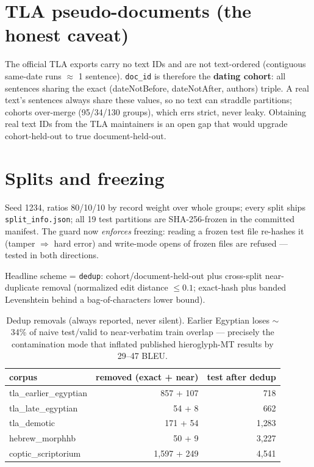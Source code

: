 \documentclass[11pt]{article}
\begin{document}
\section{TLA pseudo-documents (the honest caveat)}
The official TLA exports carry no text IDs and are not text-ordered
(contiguous same-date runs $\approx$ 1 sentence). \texttt{doc\_id} is
therefore the \textbf{dating cohort}: all sentences sharing the exact
(dateNotBefore, dateNotAfter, authors) triple. A real text's sentences always
share these values, so no text can straddle partitions; cohorts over-merge
(95/34/130 groups), which errs strict, never leaky. Obtaining real text IDs
from the TLA maintainers is an open gap that would upgrade cohort-held-out to
true document-held-out.

\section{Splits and freezing}
Seed 1234, ratios 80/10/10 by record weight over whole groups; every split
ships \texttt{split\_info.json}; all 19 test partitions are SHA-256-frozen in
the committed manifest. The guard now \emph{enforces} freezing: reading a
frozen test file re-hashes it (tamper $\Rightarrow$ hard error) and write-mode
opens of frozen files are refused --- tested in both directions.

Headline scheme = \texttt{dedup}: cohort/document-held-out plus cross-split
near-duplicate removal (normalized edit distance $\le 0.1$; exact-hash plus
banded Levenshtein behind a bag-of-characters lower bound).

\begin{table}[h]\centering\small
\begin{tabular}{lrr}
\toprule
corpus & removed (exact + near) & test after dedup \\
\midrule
tla\_earlier\_egyptian & 857 + 107 & 718 \\
tla\_late\_egyptian & 54 + 8 & 662 \\
tla\_demotic & 171 + 54 & 1{,}283 \\
hebrew\_morphhb & 50 + 9 & 3{,}227 \\
coptic\_scriptorium & 1{,}597 + 249 & 4{,}541 \\
\bottomrule
\end{tabular}
\caption{Dedup removals (always reported, never silent). Earlier Egyptian
loses $\sim$34\% of naive test/valid to near-verbatim train overlap ---
precisely the contamination mode that inflated published hieroglyph-MT
results by 29--47 BLEU.}
\end{table}
\end{document}
